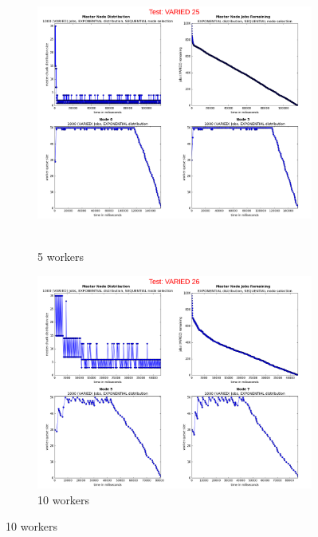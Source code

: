 \documentclass{article}
\begin{document}
\begin{figure}
  \begin{subfigure}[b]{0.5\linewidth}
    \centering
    \hbox{\hspace{-5.0em} \includegraphics[width=1.2\linewidth]{combined_varied_growing_workers_exp/case_varied_25} }
    \caption{5 workers}
    \label{testExpVaried5} 
    \vspace{4ex}
  \end{subfigure}%
  \begin{subfigure}[b]{0.5\linewidth}
    \centering
    \includegraphics[width=1.2\linewidth]{combined_varied_growing_workers_exp/case_varied_26} 
    \caption{10 workers} 
    \label{testExpVaried10} 
    \vspace{4ex}
  \end{subfigure} 
  

\end{figure}
\end{document}
